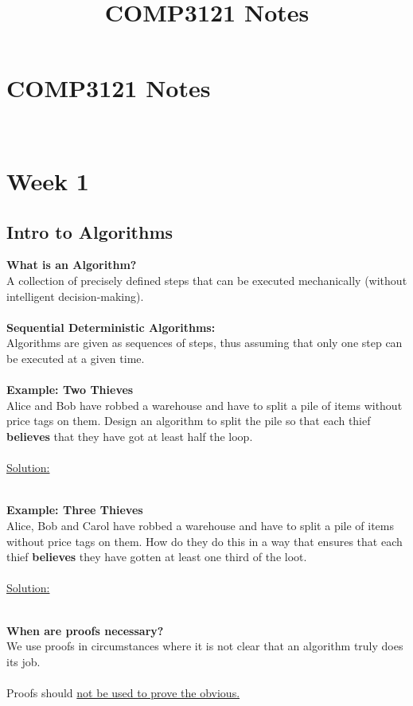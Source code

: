 \documentclass{article}
\title{COMP3121 Notes}
\begin{document}
\section*{\huge COMP3121 Notes}
~\\
\section{Week 1}
\subsection{Intro to Algorithms}

\textbf{What is an Algorithm?} \\
A collection of precisely defined steps that can be executed mechanically (without intelligent decision-making).
\\\\
\textbf{Sequential Deterministic Algorithms:} \\
Algorithms are given as sequences of steps, thus assuming that only one step can be executed at a given time.
\\\\
\textbf{Example: Two Thieves} \\
Alice and Bob have robbed a warehouse and have to split a pile of items without price tags on them. 
Design an algorithm to split the pile so that each thief \textbf{believes} that they have got at least
half the loop.
\\\\
\underline{Solution:} \\
\begin{algorithmic}
\end{algorithmic}
~\\
\textbf{Example: Three Thieves} \\
Alice, Bob and Carol have robbed a warehouse and have to split a pile of items without price tags on them. How do they do this in a way that ensures that each thief \textbf{believes} they have gotten at least one third of the loot.
\\\\
\underline{Solution:} \\
\begin{algorithmic} 
        \ENDIF
    \ENDIF
\end{algorithmic}
~\\
\textbf{When are proofs necessary?} \\
We use proofs in circumstances where it is not clear that an algorithm truly does its job. \\\\
Proofs should \underline{not be used to prove the obvious.}
\end{document}
